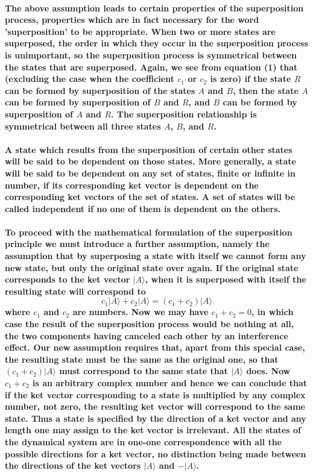 \documentclass[10pt, kindle, oneside]{kindle}
\begin{document}
\paragraph{The above assumption leads to certain properties of the superposition process, properties which are in fact necessary for the word 'superposition' to be appropriate. When two or more states are superposed, the order in which they occur in the superposition process is unimportant, so the superposition process is symmetrical between the states that are superposed. Again, we see from equation (1) that (excluding the case when the coefficient $c_1$ or $c_2$ is zero) if the state $R$ can be formed by superposition of the states $A$ and $B$, then the state $A$ can be formed by superposition of $B$ and $R$, and $B$ can be formed by superposition of $A$ and $R$. The superposition relationship is symmetrical between all three states $ A $, $ B $, and $R$.}
\paragraph{A state which results from the superposition of certain other states will be said to be dependent on those states. More generally, a state will be said to be dependent on any set of states, finite or infinite in number, if its corresponding ket vector is dependent on the corresponding ket vectors of the set of states. A set of states will be called independent if no one of them is dependent on the others.}
\paragraph{To proceed with the mathematical formulation of the superposition principle we must introduce a further assumption, namely the assumption that by superposing a state with itself we cannot form any new state, but only the original state over again. If the original state corresponds to the ket vector $ |A \rangle $, when it is superposed with itself the resulting state will correspond to $$c_1|A \rangle +c_2|A \rangle = (c_1+c_2)|A \rangle$$ where $c_1$ and $c_2$ are numbers. Now we may have $c_1+c_2 = 0$, in which case the result of the superposition process would be nothing at all, the two components having canceled each other by an interference effect. Our new assumption requires that, apart from this special case, the resulting state must be the same as the original one, so that $(c_1+c_2)|A \rangle$ must correspond to the same state that $|A \rangle$ does. Now $c_1+c_2$ is an arbitrary complex number and hence we can conclude that if the ket vector corresponding to a state is multiplied by any complex number, not zero, the resulting ket vector will correspond to the same state. Thus a state is specified by the direction of a ket vector and any length one may assign to the ket vector is irrelevant. All the states of the dynamical system are in one-one correspondence with all the possible directions for a ket vector, no distinction being made between the directions of the ket vectors $ |A \rangle $ and $ -|A \rangle $.}
\end{document}
